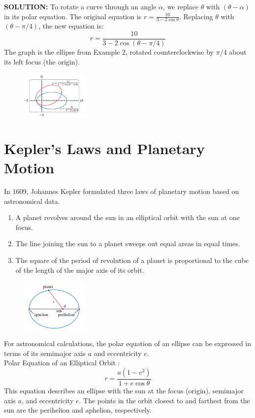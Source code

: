 \documentclass{article}
\begin{document}
\textbf{SOLUTION:}
To rotate a curve through an angle $\alpha$, we replace $\theta$ with $(\theta - \alpha)$ in its polar equation. The original equation is $r = \frac{10}{3 - 2 \cos\theta}$. Replacing $\theta$ with $(\theta - \pi/4)$, the new equation is:
\[
r = \frac{10}{3 - 2 \cos(\theta - \pi/4)}
\]
The graph is the ellipse from Example 2, rotated counterclockwise by $\pi/4$ about its left focus (the origin).
\begin{figure}[htbp]
    \centering
    \includegraphics[width=0.3\textwidth]{graph64.png}
\end{figure}

\section*{Kepler's Laws and Planetary Motion}
In 1609, Johannes Kepler formulated three laws of planetary motion based on astronomical data.
\begin{tcolorbox}[
    colback=white!,   %
    colframe=orange!80!white, %
    title=Kepler's Laws,   %
    boxrule=0.5mm,          %
    arc=3mm               %
    ]
    \begin{enumerate}
        \item A planet revolves around the sun in an elliptical orbit with the sun at one focus.
        \item The line joining the sun to a planet sweeps out equal areas in equal times.
        \item The square of the period of revolution of a planet is proportional to the cube of the length of the major axis of its orbit.
    \end{enumerate}
\end{tcolorbox}

\begin{figure}[htbp]
    \centering
    \includegraphics[width=0.3\textwidth]{graph65.png}
\end{figure}
For astronomical calculations, the polar equation of an ellipse can be expressed in terms of its semimajor axis $a$ and eccentricity $e$.\\
Polar Equation of an Elliptical Orbit :  \[
    r = \frac{a(1 - e^2)}{1 + e \cos\theta}
    \]
This equation describes an ellipse with the sun at the focus (origin), semimajor axis $a$, and eccentricity $e$.
The points in the orbit closest to and farthest from the sun are the perihelion and aphelion, respectively.
\end{document}
